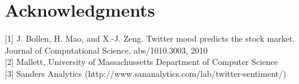 \documentclass[letterpaper]{article}
\begin{document}
\section{ Acknowledgments}

[1] J. Bollen, H. Mao, and X.-J. Zeng. Twitter mood predicts the
stock market. Journal of Computational Science,
abs/1010.3003, 2010\\

[2] Mallett, University of Massachussetts Department of Computer Science\\

[3] Sanders Analytics (http://www.sananalytics.com/lab/twitter-sentiment/)
\end{document}
